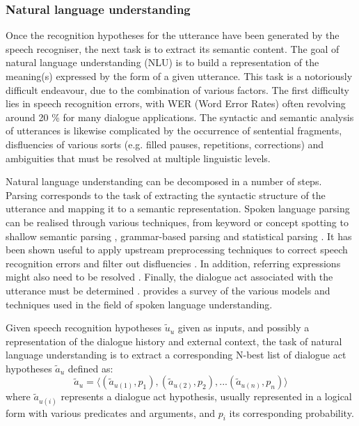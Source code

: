 \subsubsection*{Natural language understanding}
\label{section:speechunderstanding}

Once the recognition hypotheses for the utterance have been generated by the speech recogniser, the next task is to extract its semantic content.  The goal of natural language understanding (NLU) is to build a representation of the meaning(s) expressed by the form of a given utterance.  This task is a notoriously difficult endeavour, due to the combination of various factors. The first difficulty lies in speech recognition errors, with WER (Word Error Rates) often revolving around 20 \% for many dialogue applications.  The syntactic and semantic analysis of utterances is likewise complicated by the occurrence of sentential fragments,  disfluencies of various sorts (e.g. filled pauses, repetitions, corrections) and ambiguities that must be resolved at multiple linguistic levels. 

Natural language understanding can be decomposed in a number of steps.  Parsing corresponds to the task of extracting the syntactic structure of the utterance and mapping it to a semantic representation.  Spoken language parsing can be realised through various techniques, from keyword or concept spotting \citep{KomataniTKK01,ZhangZY07} to shallow semantic parsing \citep{Coppola:2009}, grammar-based parsing \citep{VanNoord1999} and statistical parsing \citep{He200585}.  It has been shown useful to apply upstream preprocessing techniques to correct speech recognition errors \citep{Ringger:1996} and filter out disfluencies \citep{Johnson:2004}. In addition, referring expressions might also need to be resolved \citep{Funakoshi:2012}.  Finally, the dialogue act associated with the utterance must be determined \citep{stolcke2000,Keizer2007}. \cite{demori2008} provides a survey of the various models and techniques used in the field of spoken language understanding. 

Given speech recognition hypotheses $\tilde{u}_u$ given as inputs, and possibly a representation of the dialogue history and external context, the task of natural language understanding is to extract a corresponding N-best list of dialogue act hypotheses $\tilde{a}_u$ defined as: \begin{equation*}
\tilde{a}_u = \langle (\tilde{a}_{u(1)}, p_{1}), (\tilde{a}_{u(2)}, p_{2}), ... (\tilde{a}_{u(n)}, p_{n})\rangle
\end{equation*}
where $\tilde{a}_{u(i)}$ represents a dialogue act hypothesis, usually represented in a logical form with various predicates and arguments, and $p_{i}$ its corresponding probability.

